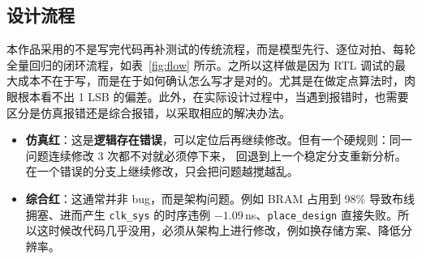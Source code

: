 \documentclass[withoutpreface,bwprint]{cumcmthesis}
\begin{document}
\subsection{设计流程}

本作品采用的不是写完代码再补测试的传统流程，而是模型先行、逐位对拍、每轮全量回归的闭环流程，如表~\ref{fig:flow} 所示。之所以这样做是因为 RTL 调试的最大成本不在于写，而是在于如何确认怎么写才是对的。尤其是在做定点算法时，肉眼根本看不出 1 LSB 的偏差。此外，在实际设计过程中，当遇到报错时，也需要区分是仿真报错还是综合报错，以采取相应的解决办法。

\begin{tcolorbox}[colback=gray!4, colframe=boxFrame, breakable,
                    title=\textbf{仿真红与综合红的不同处理方式}]
\begin{itemize}
    \item \textbf{仿真红}：这是\textbf{逻辑存在错误}，可以定位后再继续修改。但有一个硬规则：同一问题连续修改 3 次都不对就必须停下来， 回退到上一个稳定分支重新分析。在一个错误的分支上继续修改，只会把问题越搅越乱。

    \item \textbf{综合红}：这通常并非 bug，而是架构问题。例如 BRAM 占用到 98\% 导致布线拥塞、进而产生 \texttt{clk\_sys} 的时序违例 $-1.09$\,ns、\texttt{place\_design} 直接失败。所以这时候改代码几乎没用，必须从架构上进行修改，例如换存储方案、降低分辨率。
\end{itemize}
\end{tcolorbox}
\end{document}
